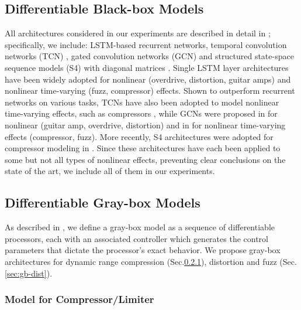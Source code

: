 \subsection{Differentiable Black-box Models}
\label{sec:bb-models}
All architectures considered in our experiments are described in detail in \citep{comunità2025nablafxframeworkdifferentiableblackbox}; specifically, we include: LSTM-based recurrent networks, temporal convolution networks (TCN) \citep{lea2016temporal}, gated convolution networks (GCN) \cite{rethage2018wavenet} and structured state-space sequence models (S4) \citep{gu2021efficiently} with diagonal matrices \citep{gupta2022diagonal}.
Single LSTM layer architectures have been widely adopted for nonlinear (overdrive, distortion, guitar amps) \citep{wright2019real, wright2020real} and nonlinear time-varying (fuzz, compressor) \citep{steinmetz2022efficient, comunita2023modelling} effects.
Shown to outperform recurrent networks on various tasks, TCNs have also been adopted to model nonlinear time-varying effects, such as compressors \citep{steinmetz2022efficient}, while GCNs were proposed in \citep{
damskagg2019deep, 
damskagg2019real, 
wright2020real} 
for nonlinear (guitar amp, overdrive, distortion) and in \citep{comunita2023modelling} for nonlinear time-varying effects (compressor, fuzz).
More recently, S4 architectures were adopted for compressor modeling in \citep{yin2024modeling, simionato2024modeling}.
Since these architectures have each been applied to some but not all types of nonlinear effects, preventing clear conclusions on the state of the art, we include all of them in our experiments.

\subsection{Differentiable Gray-box Models}
\label{sec:gb-models}
As described in \citep{comunità2025nablafxframeworkdifferentiableblackbox}, we define a gray-box model as a sequence of differentiable processors, each with an associated controller which generates the control parameters that dictate the processor's exact behavior.
We propose gray-box architectures for dynamic range compression (Sec.\ref{sec:gb-comp}), distortion and fuzz (Sec.\ref{sec:gb-dist}).

\subsubsection{Model for Compressor/Limiter}
\label{sec:gb-comp}

